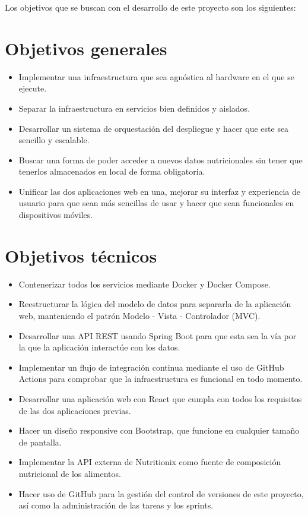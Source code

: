 
Los objetivos que se buscan con el desarrollo de este proyecto son los siguientes:

\section{Objetivos generales}
\begin{itemize}
	\item Implementar una infraestructura que sea agnóstica al hardware en el que se ejecute.
	\item Separar la infraestructura en servicios bien definidos y aislados.
	\item Desarrollar un sistema de orquestación del despliegue y hacer que este sea sencillo y escalable.
	\item Buscar una forma de poder acceder a nuevos datos nutricionales sin tener que tenerlos almacenados en local de forma obligatoria.
	\item Unificar las dos aplicaciones web en una, mejorar su interfaz y experiencia de usuario para que sean más sencillas de usar y hacer que sean funcionales en dispositivos móviles.
	\end{itemize}
	
\section{Objetivos técnicos}
\begin{itemize}
\item Contenerizar todos los servicios mediante Docker y Docker Compose.
\item Reestructurar la lógica del modelo de datos para separarla de la aplicación web, manteniendo el patrón Modelo - Vista - Controlador (MVC).
\item Desarrollar una API REST usando Spring Boot para que esta sea la vía por la que la aplicación interactúe con los datos.
\item Implementar un flujo de integración continua mediante el uso de GitHub Actions para comprobar que la infraestructura es funcional en todo momento.
\item Desarrollar una aplicación web con React que cumpla con todos los requisitos de las dos aplicaciones previas.
\item Hacer un diseño responsive con Bootstrap, que funcione en cualquier tamaño de pantalla.
\item Implementar la API externa de Nutritionix como fuente de composición nutricional de los alimentos.
\item Hacer uso de GitHub para la gestión del control de versiones de este proyecto, así como la administración de las tareas y los sprints.

\end{itemize}